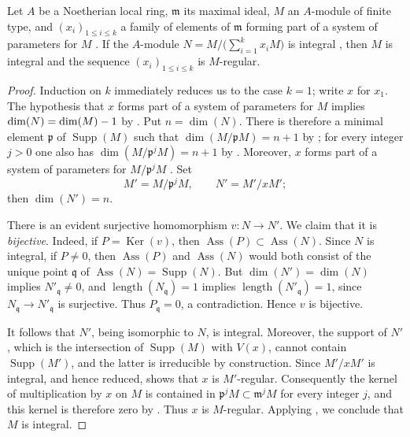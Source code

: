 \begin{corollary}[3.4.7]
\label{IV.3.4.7}
Let $A$ be a Noetherian local ring, $\mathfrak m$ its maximal ideal, $M$ an $A$-module of finite type, and $(x_i)_{1\leqslant i\leqslant k}$ a family of elements of $\mathfrak m$ forming part of a system of parameters for $M$ .
If the $A$-module $N=M\Big/\Big(\sum_{i=1}^k x_iM\Big)$
is integral , then $M$ is integral and the sequence $(x_i)_{1\leqslant i\leqslant k}$ is $M$-regular.
\end{corollary}

\begin{proof}
Induction on $k$ immediately reduces us to the case $k=1$; write $x$ for $x_1$.
The hypothesis that $x$ forms part of a system of parameters for $M$ implies $\dim(N)=\dim(M)- 1$
by .
Put $n=\dim(N)$.
There is therefore a minimal element $\mathfrak p$ of $\operatorname{Supp}(M)$ such that $\dim(M/\mathfrak pM)=n+1$
by ; for every integer $j>0$ one also has $\dim(M/\mathfrak p^jM)=n+1$
by .
Moreover, $x$ forms part of a system of parameters for $M/\mathfrak p^jM$ .
Set
\[
M'=M/\mathfrak p^jM,
\qquad
N'=M'/xM';
\]
then $\dim(N')=n$.

There is an evident surjective homomorphism $v:N\to N'$.
We claim that it is \emph{bijective}.
Indeed, if $P=\operatorname{Ker}(v)$, then $\operatorname{Ass}(P)\subset\operatorname{Ass}(N)$.
Since $N$ is integral, if $P\neq 0$, then $\operatorname{Ass}(P)$ and $\operatorname{Ass}(N)$ would both consist of the unique point $\mathfrak q$ of $\operatorname{Ass}(N)=\operatorname{Supp}(N)$.
But $\dim(N')=\dim(N)$ implies $N'_{\mathfrak q}\neq 0$, and $\operatorname{length}(N_{\mathfrak q})=1$ implies $\operatorname{length}(N'_{\mathfrak q})=1$, since $N_{\mathfrak q}\to N'_{\mathfrak q}$ is surjective.
Thus $P_{\mathfrak q}=0$, a contradiction.
Hence $v$ is bijective.

It follows that $N'$, being isomorphic to $N$, is integral.
Moreover, the support of $N'$, which is the intersection of $\operatorname{Supp}(M)$ with $V(x)$, cannot contain $\operatorname{Supp}(M')$, and the latter is irreducible by construction.
Since $M'/xM'$ is integral, and hence reduced,  shows that $x$ is $M'$-regular.
Consequently the kernel of multiplication by $x$ on $M$ is contained in $\mathfrak p^jM\subset\mathfrak m^jM$
for every integer $j$, and this kernel is therefore zero by .
Thus $x$ is $M$-regular.
Applying , we conclude that $M$ is integral.
\end{proof}

